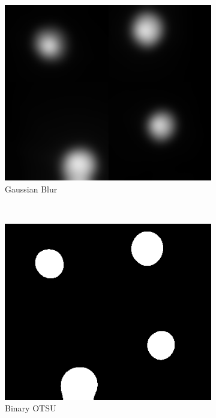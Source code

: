 \begin{figure}[!t]
\begin{subfigure}[h]{0.16\textwidth}
      \includegraphics[width=\textwidth]{pic/bbox/bbox_B_gaussianBlur400_crop.png}
      \caption{Gaussian Blur} \label{fig:bbox_blur}
   \end{subfigure}%
   ~  
   \begin{subfigure}[h]{0.16\textwidth}
      \includegraphics[width=\textwidth]{pic/bbox/bbox_C_OTSU400_crop.png}
      \caption{Binary OTSU} \label{fig:bbox_otsu}
   \end{subfigure}%
   ~
   \begin{subfigure}[h]{0.16\textwidth}

\end{subfigure}
\end{figure}
